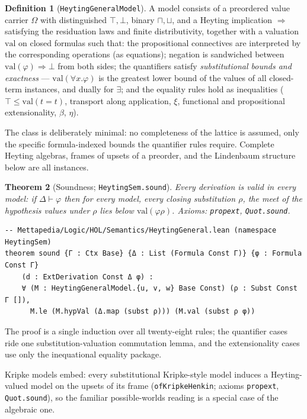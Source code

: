 \documentclass[11pt]{article}
\newcommand{\code}[1]{\texttt{#1}}
\newcommand{\himp}{\Rightarrow}
\theoremstyle{plain}
\newtheorem{theorem}{Theorem}[section]
\theoremstyle{definition}
\newtheorem{definition}[theorem]{Definition}
\begin{document}
\begin{definition}[\code{HeytingGeneralModel}]
A model consists of a preordered value carrier $\Omega$ with distinguished
$\top,\bot$, binary $\sqcap,\sqcup$, and a Heyting implication $\himp$
satisfying the residuation laws and finite distributivity, together with a
valuation $\mathrm{val}$ on closed formulas such that: the propositional
connectives are interpreted by the corresponding operations (as equations);
negation is sandwiched between $\mathrm{val}(\varphi)\himp\bot$ from both
sides; the quantifiers satisfy \emph{substitutional bounds and exactness} ---
$\mathrm{val}(\forall x.\varphi)$ is the greatest lower bound of the values
of all closed-term instances, and dually for $\exists$; and the equality
rules hold as inequalities ($\top\le\mathrm{val}(t=t)$, transport along
application, $\xi$, functional and propositional extensionality, $\beta$,
$\eta$).
\end{definition}

The class is deliberately minimal: no completeness of the lattice is assumed,
only the specific formula-indexed bounds the quantifier rules require.
Complete Heyting algebras, frames of upsets of a preorder, and the Lindenbaum
structure below are all instances.

\begin{theorem}[Soundness; \code{HeytingSem.sound}]
Every derivation is valid in every model: if
$\Delta\vdash\varphi$ then for every model, every closing substitution
$\rho$, the meet of the hypothesis values under $\rho$ lies below
$\mathrm{val}(\varphi\rho)$.
Axioms: \code{propext}, \code{Quot.sound}.
\end{theorem}

\begin{lstlisting}
-- Mettapedia/Logic/HOL/Semantics/HeytingGeneral.lean (namespace HeytingSem)
theorem sound {Γ : Ctx Base} {Δ : List (Formula Const Γ)} {φ : Formula Const Γ}
    (d : ExtDerivation Const Δ φ) :
    ∀ (M : HeytingGeneralModel.{u, v, w} Base Const) (ρ : Subst Const Γ []),
      M.le (M.hypVal (Δ.map (subst ρ))) (M.val (subst ρ φ))
\end{lstlisting}

The proof is a single induction over all twenty-eight rules; the quantifier
cases ride one substitution-valuation commutation lemma, and the
extensionality cases use only the inequational equality package.

Kripke models embed: every substitutional Kripke-style model induces a
Heyting-valued model on the upsets of its frame
(\code{ofKripkeHenkin}; axioms \code{propext}, \code{Quot.sound}), so the
familiar possible-worlds reading is a special case of the algebraic one.
\end{document}
